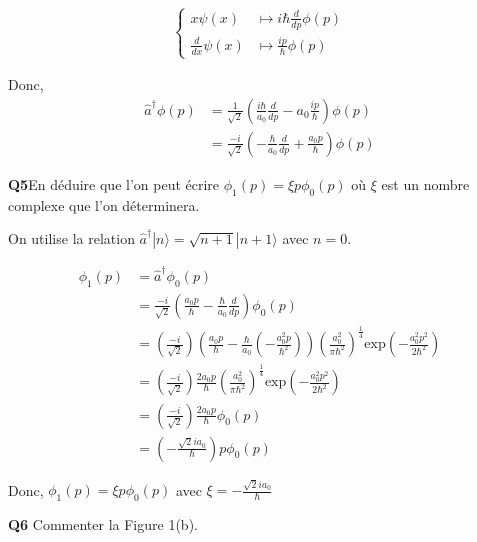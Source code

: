 \documentclass[french]{article}
\begin{document}
	\begin{align}
		\begin{cases}
			x \psi(x) &\mapsto i\hbar \frac{d}{dp}\phi(p)\\
			\frac{d}{dx} \psi(x) &\mapsto \frac{ip}{\hbar} \phi(p)
		\end{cases}
	\end{align}
	
	Donc,
	\begin{align}
		\hat{a}^\dag \phi(p) &= \frac{1}{\sqrt{2}} \left(\frac{i\hbar}{a_0}\frac{d}{dp} - a_0\frac{ip}{\hbar}\right) \phi(p)\\
		&= \frac{-i}{\sqrt{2}} \left(-\frac{\hbar}{a_0}\frac{d}{dp} + \frac{a_0p}{\hbar}\right) \phi(p)
	\end{align}

	\begin{tcolorbox}[colback=gray!5!white,colframe=gray!75!black]
		\textbf{\large{Q5}}En déduire que l'on peut écrire $\phi_1(p) = \xi p \phi_0(p)$ où $\xi$ est un nombre complexe que l'on déterminera. 
	\end{tcolorbox}

	On utilise la relation $\hat{a}^\dag |n\rangle = \sqrt{n+1} |n+1\rangle$ avec $n = 0$.
	
	\begin{align}
		\phi_1(p) &= \hat{a}^\dag \phi_0(p)\\
		&= \frac{-i}{\sqrt{2}} \left(\frac{a_0p}{\hbar} -\frac{\hbar}{a_0}\frac{d}{dp}\right) \phi_0(p)\\
		&= \left(\frac{-i}{\sqrt{2}}\right)\left(\frac{a_0p}{\hbar} - \frac{\hbar}{a_0}\left(-\frac{a_0^2p}{\hbar^2}\right)\right)\left(\frac{a_0^2}{\pi \hbar^2}\right)^{\frac{1}{4}}\text{exp}\left(-\frac{a_0^2p^2}{2\hbar^2}\right)\\
		&=\left(\frac{-i}{\sqrt{2}}\right) \frac{2a_0p}{\hbar}\left(\frac{a_0^2}{\pi \hbar^2}\right)^{\frac{1}{4}}\text{exp}\left(-\frac{a_0^2p^2}{2\hbar^2}\right)\\
		&= \left(\frac{-i}{\sqrt{2}}\right) \frac{2a_0p}{\hbar}\phi_0(p)\\
		&= \left(-\frac{\sqrt{2}ia_0}{\hbar}\right)p\phi_0(p)
	\end{align}
	
	Donc, $\phi_1(p) = \xi p \phi_0(p)$ avec $\xi = -\frac{\sqrt{2}ia_0}{\hbar}$


	\begin{tcolorbox}[colback=gray!5!white,colframe=gray!75!black]
		\textbf{\large{Q6}} Commenter la Figure 1(b).
	\end{tcolorbox}
\end{document}
